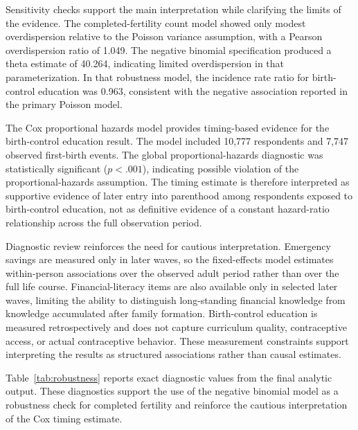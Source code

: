 \documentclass[12pt]{article}
\begin{document}
Sensitivity checks support the main interpretation while clarifying the limits of the evidence. The completed-fertility count model showed only modest overdispersion relative to the Poisson variance assumption, with a Pearson overdispersion ratio of 1.049. The negative binomial specification produced a theta estimate of 40.264, indicating limited overdispersion in that parameterization. In that robustness model, the incidence rate ratio for birth-control education was 0.963, consistent with the negative association reported in the primary Poisson model.

The Cox proportional hazards model provides timing-based evidence for the birth-control education result. The model included 10,777 respondents and 7,747 observed first-birth events. The global proportional-hazards diagnostic was statistically significant ($p < .001$), indicating possible violation of the proportional-hazards assumption. The timing estimate is therefore interpreted as supportive evidence of later entry into parenthood among respondents exposed to birth-control education, not as definitive evidence of a constant hazard-ratio relationship across the full observation period.

Diagnostic review reinforces the need for cautious interpretation. Emergency savings are measured only in later waves, so the fixed-effects model estimates within-person associations over the observed adult period rather than over the full life course. Financial-literacy items are also available only in selected later waves, limiting the ability to distinguish long-standing financial knowledge from knowledge accumulated after family formation. Birth-control education is measured retrospectively and does not capture curriculum quality, contraceptive access, or actual contraceptive behavior. These measurement constraints support interpreting the results as structured associations rather than causal estimates.

Table~\ref{tab:robustness} reports exact diagnostic values from the final analytic output. These diagnostics support the use of the negative binomial model as a robustness check for completed fertility and reinforce the cautious interpretation of the Cox timing estimate.
\end{document}
